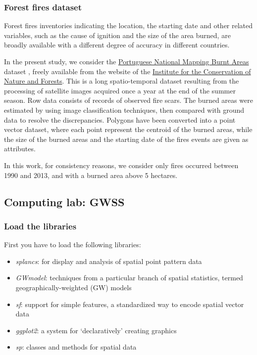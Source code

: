 \documentclass[
]{article}
\providecommand{\tightlist}{%
  \setlength{\itemsep}{0pt}\setlength{\parskip}{0pt}}
\begin{document}
\subsubsection{Forest fires dataset}\label{forest-fires-dataset}

Forest fires inventories indicating the location, the starting date and other related variables, such as the cause of ignition and the size of the area burned, are broadly available with a different degree of accuracy in different countries.

In the present study, we consider the \href{https://www.icnf.pt/florestas/gfr/gfrgestaoinformacao/dfciinformacaocartografica}{Portuguese National Mapping Burnt Areas} dataset , freely available from the website of the \href{https://www.icnf.pt/}{Institute for the Conservation of Nature and Forests}. This is a long spatio-temporal dataset resulting from the processing of satellite images acquired once a year at the end of the summer season. Row data consists of records of observed fire scars. The burned areas were estimated by using image classification techniques, then compared with ground data to resolve the discrepancies. Polygons have been converted into a point vector dataset, where each point represent the centroid of the burned areas, while the size of the burned areas and the starting date of the fires events are given as attributes.

In this work, for consistency reasons, we consider only fires occurred between 1990 and 2013, and with a burned area above 5 hectares.

\subsection{Computing lab: GWSS}\label{computing-lab-gwss}

\subsubsection{Load the libraries}\label{load-the-libraries}

First you have to load the following libraries:

\begin{itemize}
\tightlist
\item
  \emph{splancs}: for display and analysis of spatial point pattern data
\item
  \emph{GWmodel}: techniques from a particular branch of spatial statistics, termed geographically-weighted (GW) models
\item
  \emph{sf}: support for simple features, a standardized way to encode spatial vector data
\item
  \emph{ggplot2}: a system for `declaratively' creating graphics
\item
  \emph{sp}: classes and methods for spatial data
\end{itemize}
\end{document}
